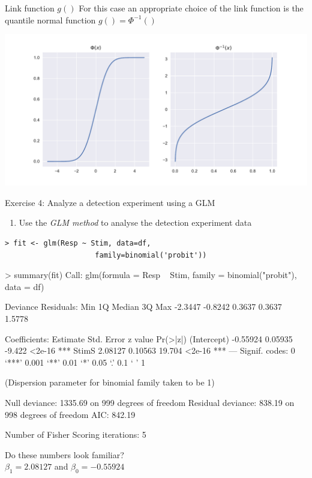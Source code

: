 \documentclass[10pt]{beamer}
\begin{document}
\begin{frame}{Link function $g()$}
For this case an appropriate choice of the link function is the quantile normal function $g() = \Phi^{-1}()$

\begin{center}
\includegraphics[scale=0.5]{figs/linkfun.pdf}
\end{center}

\end{frame}

\begin{frame}[fragile]{Exercise 4: Analyze a detection experiment using a GLM}
\begin{enumerate}
\item Use the \textit{GLM method} to analyse the detection experiment data\\
\end{enumerate}

\pause
\begin{verbatim}
> fit <- glm(Resp ~ Stim, data=df, 
                     family=binomial('probit'))
\end{verbatim}
\end{frame}


\begin{frame}[fragile]{}
\begin{verbnobox}[\small]
> summary(fit)
Call:
glm(formula = Resp ~ Stim, family = binomial("probit"), data = df)

Deviance Residuals: 
    Min       1Q   Median       3Q      Max  
-2.3447  -0.8242   0.3637   0.3637   1.5778  

Coefficients:
            Estimate Std. Error z value Pr(>|z|)    
(Intercept) -0.55924    0.05935  -9.422   <2e-16 ***
StimS        2.08127    0.10563  19.704   <2e-16 ***
---
Signif. codes:  0 ‘***’ 0.001 ‘**’ 0.01 ‘*’ 0.05 ‘.’ 0.1 ‘ ’ 1

(Dispersion parameter for binomial family taken to be 1)

    Null deviance: 1335.69  on 999  degrees of freedom
Residual deviance:  838.19  on 998  degrees of freedom
AIC: 842.19

Number of Fisher Scoring iterations: 5
\end{verbnobox}

\begin{center}
Do these numbers look familiar? \\
$\beta_1 = 2.08127$ and $\beta_0 = -0.55924 $
\end{center}
\end{frame}
\end{document}
